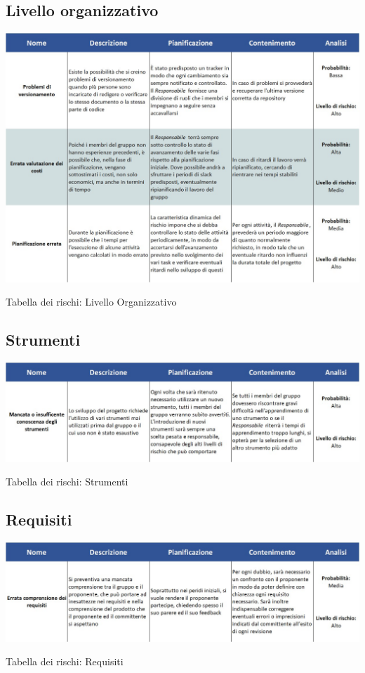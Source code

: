 \subsection{Livello organizzativo}
\begin{table}[h!]
	\centerline{\includegraphics[scale=0.55]{img/Rischi/LivelloOrganizzativo.jpg}}
	\caption{Tabella dei rischi: Livello Organizzativo}
\end{table}
\clearpage

\subsection{Strumenti}
\begin{table}[h!]
	\centerline{\includegraphics[scale=0.55]{img/Rischi/Strumenti.jpg}}
	\caption{Tabella dei rischi: Strumenti}
\end{table}

\subsection{Requisiti}
\begin{table}[h!]
	\centerline{\includegraphics[scale=0.55]{img/Rischi/Requisiti.jpg}}
	\caption{Tabella dei rischi: Requisiti}
\end{table}
\clearpage